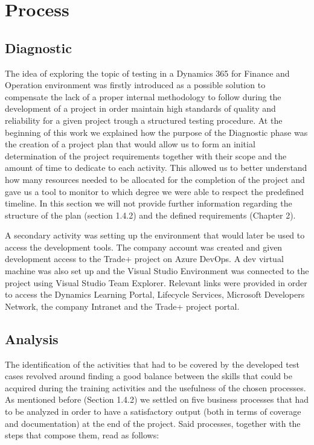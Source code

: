 \chapter{Process}

\section{Diagnostic} 

The idea of exploring the topic of testing in a Dynamics 365 for Finance and Operation environment was firstly introduced as a possible solution to compensate the lack of a proper internal methodology to follow during the development of a project in order maintain high standards of quality and reliability for a given project trough a structured testing procedure. 
At the beginning of this work we explained how the purpose of the Diagnostic phase was the creation of a project plan that would allow us to form an initial determination of the project requirements together with their scope and the amount of time to dedicate to each activity. This allowed us to better understand how many resources needed to be allocated for the completion of the project and gave us a tool to monitor to which degree we were able to respect the predefined timeline. In this section we will not provide further information regarding the structure of the plan (section 1.4.2) and the defined requirements (Chapter 2).

A secondary activity was setting up the environment that would later be used to access the development tools. The company account was created and given development access to the Trade+ project on Azure DevOps. A dev virtual machine was also set up and the Visual Studio Environment was connected to the project using Visual Studio Team Explorer. Relevant links were provided in order to access the Dynamics Learning Portal, Lifecycle Services, Microsoft Developers Network, the company Intranet and the Trade+ project portal.

\section{Analysis} 

The identification of the activities that had to be covered by the developed test cases revolved around finding a good balance between the skills that could be acquired during the training activities and the usefulness of the chosen processes. As mentioned before (Section 1.4.2) we settled on five business processes that had to be analyzed in order to have a satisfactory output (both in terms of coverage and documentation) at the end of the project. Said processes, together with the steps that compose them, read as follows:

